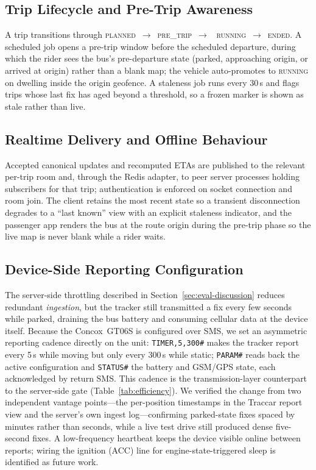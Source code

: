 \documentclass[conference]{IEEEtran}
\begin{document}
\subsection{Trip Lifecycle and Pre-Trip Awareness}
\label{sec:impl-lifecycle}
A trip transitions through
\textsc{planned}~$\rightarrow$~\textsc{pre\_trip}~$\rightarrow$~%
\textsc{running}~$\rightarrow$~\textsc{ended}. A scheduled job opens a
pre-trip window before the scheduled departure, during which the rider sees
the bus's pre-departure state (parked, approaching origin, or arrived at
origin) rather than a blank map; the vehicle auto-promotes to \textsc{running}
on dwelling inside the origin geofence. A staleness job runs every 30\,s and
flags trips whose last fix has aged beyond a threshold, so a frozen marker is
shown as stale rather than live.

\subsection{Realtime Delivery and Offline Behaviour}
\label{sec:impl-realtime}
Accepted canonical updates and recomputed ETAs are published to the relevant
per-trip room and, through the Redis adapter, to peer server processes
holding subscribers for that trip; authentication is enforced on socket
connection and room join. The client retains the most recent state so a
transient disconnection degrades to a ``last known'' view with an explicit
staleness indicator, and the passenger app renders the bus at the route
origin during the pre-trip phase so the live map is never blank while a rider
waits.

\subsection{Device-Side Reporting Configuration}
\label{sec:impl-device}
The server-side throttling described in Section~\ref{sec:eval-discussion}
reduces redundant \emph{ingestion}, but the tracker still transmitted a fix
every few seconds while parked, draining the bus battery and consuming
cellular data at the device itself. Because the Concox~GT06S is configured
over SMS, we set an asymmetric reporting cadence directly on the unit:
\texttt{TIMER,5,300\#} makes the tracker report every 5\,s while moving but
only every 300\,s while static; \texttt{PARAM\#} reads back the active
configuration and \texttt{STATUS\#} the battery and GSM/GPS state, each
acknowledged by return SMS. This cadence is the transmission-layer
counterpart to the server-side gate (Table~\ref{tab:efficiency}). We
verified the change from two independent vantage points---the per-position
timestamps in the Traccar report view and the server's own ingest
log---confirming parked-state fixes spaced by minutes rather than seconds,
while a live test drive still produced dense five-second fixes. A
low-frequency heartbeat keeps the device visible online between reports;
wiring the ignition (ACC) line for engine-state-triggered sleep is
identified as future work.
\end{document}
